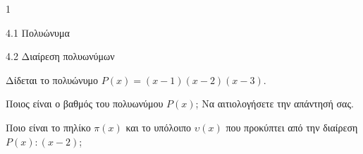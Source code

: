 \begin{ylh}{1}
\item 4.1 Πολυώνυμα
\item 4.2 Διαίρεση πολυωνύμων
\end{ylh}
Δίδεται το πολυώνυμο $P(x) = (x - 1)(x - 2)(x - 3)$.
\begin{alist}
\item Ποιος είναι ο βαθμός του πολυωνύμου $P(x)$; Να αιτιολογήσετε την απάντησή σας.
\item Ποιο είναι το πηλίκο $\pi(x)$ και το υπόλοιπο $\upsilon(x)$ που προκύπτει από την διαίρεση $P(x):(x - 2)$;
\end{alist}

